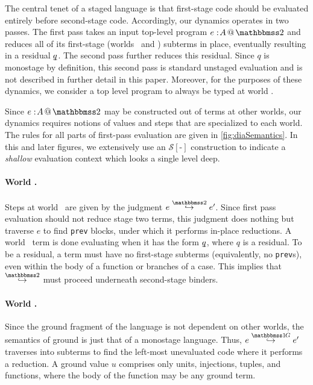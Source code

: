 
\begin{abstrsyn}
The central tenet of a staged language
is that first-stage code should be evaluated entirely before second-stage code.
Accordingly, our dynamics operates in two passes.
The first pass takes an input top-level program $\coltwo e A$
and reduces all of its first-stage (worlds \bbonem\ and \bbonep) subterms in place,
eventually resulting in a residual $\underline{\smash{q}}$.
The second pass further reduces this residual.
Since $q$ is monostage by definition, this second pass is standard unstaged evaluation
and is not described in further detail in this paper.
Moreover, for the purposes of these dynamics, we consider a top level program to always be typed at world \bbtwo.

Since $\coltwo e A$ may be constructed out of terms at other worlds, 
our dynamics requires notions of values and steps that are specialized to each world.
The rules for all parts of first-pass evaluation are given in \ref{fig:diaSemantics}.
In this and later figures, we extensively use an $\mathcal{S}[\text{-}]$ construction
to indicate a \emph{shallow} evaluation context which looks a single level deep.

\paragraph{World \bbtwo.} Steps at world \bbtwo\ are given by the judgment \mbox{$\steptwo e {e'}$}.
Since first pass evaluation should not reduce stage two terms, this judgment does nothing but traverse $e$ to find {\tt prev} blocks, under which it performs in-place reductions.
A world \bbtwo\ term is done evaluating when it has the form $\underline{\smash{q}}$, where $q$ is a residual. 
To be a residual, a term must have no first-stage subterms (equivalently, no {\tt prev}s), even within the body of a function or branches of a case.
This implies that $\stepsym \bbtwo$ must proceed underneath second-stage binders.

\paragraph{World \bbonep.} Since the ground fragment of the language is not dependent on other worlds, the semantics of ground is just that of a monostage language.
Thus, $\steppure e {e'}$ traverses into subterms to find the left-most unevaluated code where it performs a reduction. 
A ground value $u$ comprises only units, injections, tuples, and functions, where the body of the function may be any ground term.


\end{abstrsyn}
